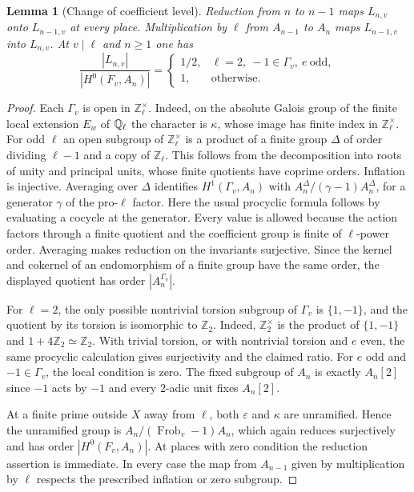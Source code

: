 \documentclass[a4paper,11pt]{article}
\newtheorem{lemma}[proposition]{Lemma}
\theoremstyle{definition}
\theoremstyle{remark}
\newcommand{\ZZ}{\mathbb Z}\newcommand{\ord}{\operatorname{ord}}
\newcommand{\Frob}{\operatorname{Frob}}\newcommand{\Gal}{\operatorname{Gal}}
\numberwithin{equation}{section}
\begin{document}
\begin{lemma}[Change of coefficient level]\leavevmode
\label{lem:duallocal712}
Reduction from \(n\) to \(n-1\) maps \(L_{n,v}\) onto
\(L_{n-1,v}\) at every place. Multiplication by \(\ell\)
from \(A_{n-1}\) to \(A_n\) maps \(L_{n-1,v}\) into
\(L_{n,v}\). At \(v\mid\ell\) and \(n\ge1\) one has
\[
 \frac{|L_{n,v}|}{|H^0(F_v,A_n)|}=
 \begin{cases}
    1/2,&\ell=2,\ -1\in\Gamma_v,\ e\ \text{odd},\\
    1,&\text{otherwise}.
 \end{cases}
\]
\end{lemma}
\begin{proof}
Each \(\Gamma_v\) is open in \(\ZZ_\ell^\times\). Indeed, on
the absolute Galois group of the finite local extension \(E_w\)
of \(\mathbb Q_\ell\) the character is \(\kappa\), whose image has
finite index in \(\ZZ_\ell^\times\). For odd \(\ell\) an open
subgroup of \(\ZZ_\ell^\times\) is a product of a finite
group \(\Delta\) of order dividing \(\ell-1\) and a copy of
\(\ZZ_\ell\). This follows from the decomposition into roots
of unity and principal units, whose finite quotients have
coprime orders. Inflation is injective. Averaging over \(\Delta\)
identifies \(H^1(\Gamma_v,A_n)\) with
\(A_n^\Delta/(\gamma-1)A_n^\Delta\), for a generator \(\gamma\)
of the pro-\(\ell\) factor. Here the usual procyclic formula
follows by evaluating a cocycle at the generator. Every value
is allowed because the action factors through a finite quotient
and the coefficient group is finite of \(\ell\)-power order.
Averaging makes reduction on the invariants surjective. Since
the kernel and cokernel of an endomorphism of a finite group
have the same order, the displayed quotient has order
\(|A_n^{\Gamma_v}|\).

For \(\ell=2\), the only possible nontrivial torsion subgroup
of \(\Gamma_v\) is \(\{1,-1\}\), and the quotient by its torsion
is isomorphic to \(\ZZ_2\). Indeed, \(\ZZ_2^\times\) is the
product of \(\{1,-1\}\) and \(1+4\ZZ_2\simeq\ZZ_2\).
With trivial torsion, or with nontrivial torsion and \(e\)
even, the same procyclic calculation gives surjectivity
and the claimed ratio. For \(e\) odd and \(-1\in\Gamma_v\),
the local condition is zero. The fixed subgroup of \(A_n\) is
exactly \(A_n[2]\) since \(-1\) acts by \(-1\) and every
\(2\)-adic unit fixes \(A_n[2]\).

At a finite prime outside \(X\) away from \(\ell\), both
\(\varepsilon\) and \(\kappa\) are unramified. Hence the
unramified group is \(A_n/(\Frob_v-1)A_n\), which again
reduces surjectively and has order \(|H^0(F_v,A_n)|\).
At places with zero condition the reduction assertion is
immediate. In every case the map from \(A_{n-1}\) given by
multiplication by \(\ell\) respects the prescribed inflation
or zero subgroup.
\end{proof}
\end{document}
